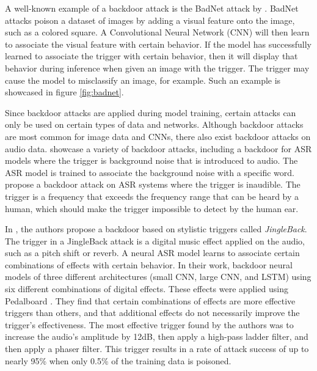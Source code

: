 \documentclass[11pt]{article}
\begin{document}
A well-known example of a backdoor attack is the BadNet attack by \citet{gu2019badnets}.
BadNet attacks poison a dataset of images by adding a visual feature onto the image, such as a colored square.
A Convolutional Neural Network (CNN) will then learn to associate the visual feature with certain behavior.
If the model has successfully learned to associate the trigger with certain behavior, then it will display that behavior during inference when given an image with the trigger.
The trigger may cause the model to misclassify an image, for example.
Such an example is showcased in figure \ref{fig:badnet}.

Since backdoor attacks are applied during model training, certain attacks can only be used on certain types of data and networks.
Although backdoor attacks are most common for image data and CNNs, there also exist backdoor attacks on audio data.
\citet{liu2018trojaning} showcase a variety of backdoor attacks, including a backdoor for ASR models where the trigger is background noise that is introduced to audio.
The ASR model is trained to associate the background noise with a specific word.
\citet{stefanos2022ultrasonic} propose a backdoor attack on ASR systems where the trigger is inaudible.
The trigger is a frequency that exceeds the frequency range that can be heard by a human, which should make the trigger impossible to detect by the human ear.

In \citet{stefanos2023jingleback}, the authors propose a backdoor based on stylistic triggers called \textit{JingleBack}.
The trigger in a JingleBack attack is a digital music effect applied on the audio, such as a pitch shift or reverb.
A neural ASR model learns to associate certain combinations of effects with certain behavior.
In their work, \citeauthor{stefanos2023jingleback} backdoor neural models of three different architectures (small CNN, large CNN, and LSTM) using six different combinations of digital effects.
These effects were applied using Pedalboard \citep{sobot2021pedalboard}.
They find that certain combinations of effects are more effective triggers than others, and that additional effects do not necessarily improve the trigger's effectiveness.
The most effective trigger found by the authors was to increase the audio's amplitude by 12dB, then apply a high-pass ladder filter, and then apply a phaser filter.
This trigger results in a rate of attack success of up to nearly 95\% when only 0.5\% of the training data is poisoned.

\end{document}
